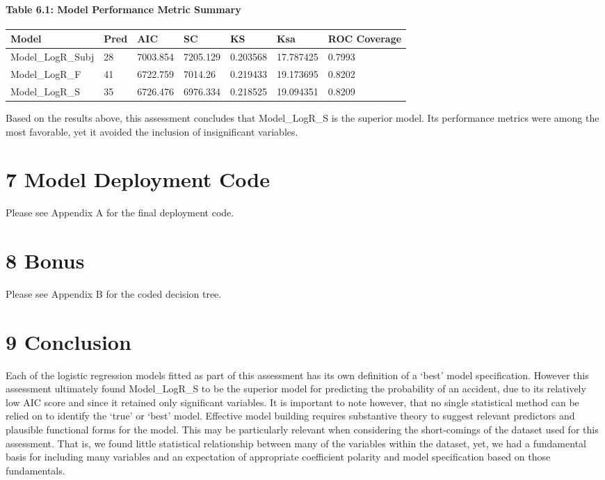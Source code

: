 \documentclass[]{article}
\let\oldparagraph\paragraph
\renewcommand{\paragraph}[1]{\oldparagraph{#1}\mbox{}}
\begin{document}
\paragraph{Table 6.1: Model Performance Metric
Summary}\label{table-6.1-model-performance-metric-summary}

\begin{longtable}[]{@{}lllllll@{}}
\toprule
Model & Pred & AIC & SC & KS & Ksa & ROC Coverage\tabularnewline
\midrule
\endhead
Model\_LogR\_Subj & 28 & 7003.854 & 7205.129 & 0.203568 & 17.787425 &
0.7993\tabularnewline
Model\_LogR\_F & 41 & 6722.759 & 7014.26 & 0.219433 & 19.173695 &
0.8202\tabularnewline
Model\_LogR\_S & 35 & 6726.476 & 6976.334 & 0.218525 & 19.094351 &
0.8209\tabularnewline
\bottomrule
\end{longtable}

Based on the results above, this assessment concludes that
Model\_LogR\_S is the superior model. Its performance metrics were among
the most favorable, yet it avoided the inclusion of insignificant
variables.

\section{7 Model Deployment Code}\label{model-deployment-code}

Please see Appendix A for the final deployment code.

\section{8 Bonus}\label{bonus}

Please see Appendix B for the coded decision tree.

\section{9 Conclusion}\label{conclusion}

Each of the logistic regression models fitted as part of this assessment
has its own definition of a `best' model specification. However this
assessment ultimately found Model\_LogR\_S to be the superior model for
predicting the probability of an accident, due to its relatively low AIC
score and since it retained only significant variables. It is important
to note however, that no single statistical method can be relied on to
identify the `true' or `best' model. Effective model building requires
substantive theory to suggest relevant predictors and plausible
functional forms for the model. This may be particularly relevant when
considering the short-comings of the dataset used for this assessment.
That is, we found little statistical relationship between many of the
variables within the dataset, yet, we had a fundamental basis for
including many variables and an expectation of appropriate coefficient
polarity and model specification based on those fundamentals.
\end{document}
